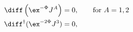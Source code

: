 \begin{equation}
\label{spinSU4cond}
\begin{aligned}
   \diff \left( \ex^{-\Phi} J^A\right) &= 0 ,  \qquad \text{for $A=1,2$}\\
   \diff^\dagger (\ex^{-2\Phi} J^3) &= 0 ,
\end{aligned}
\end{equation}

